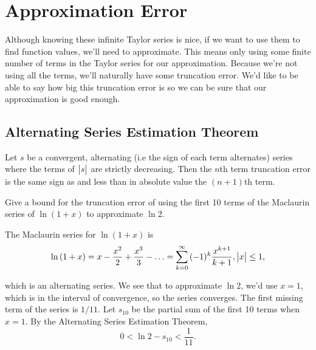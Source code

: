 \section{Approximation Error}
Although knowing these infinite Taylor series is nice, if we want to use them to find function values, we'll need to approximate.
This means only using some finite number of terms in the Taylor series for our approximation.
Because we're not using all the terms, we'll naturally have some truncation error.
We'd like to be able to say how big this truncation error is so we can be sure that our approximation is good enough.

\subsection{Alternating Series Estimation Theorem}
\begin{theorem}
	Let $s$ be a convergent, alternating (i.e the sign of each term alternates) series where the terms of $\big\lvert s \big\rvert$ are strictly decreasing.
	Then the $n$th term truncation error is the same sign as and less than in absolute value the $(n+1)$th term.
\end{theorem}

\begin{example}
	Give a bound for the truncation error of using the first 10 terms of the Maclaurin series of $\ln{(1+x)}$ to approximate $\ln{2}$.
\end{example}
\begin{answer}
	The Maclaurin series for $\ln{(1+x)}$ is
	\begin{equation*}
		\ln{(1+x)} = x - \frac{x^2}{2} + \frac{x^3}{3} - \ldots = \sum_{k=0}^{\infty}{(-1)^k\frac{x^{k+1}}{k+1}}, \big\lvert x \big\rvert \leq 1,
	\end{equation*}
	
	which is an alternating series.
	We see that to approximate $\ln{2}$, we'd use $x=1$, which is in the interval of convergence, so the series converges.
	The first missing term of the series is $1/11$.
	Let $s_{10}$ be the partial sum of the first 10 terms when $x=1$.
	By the Alternating Series Estimation Theorem,
	\begin{equation*}
		0 < \ln{2} - s_{10} < \frac{1}{11}.
	\end{equation*}
\end{answer}

